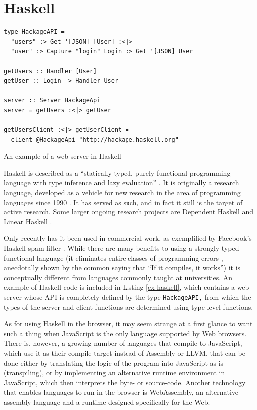 \documentclass[english,zadani,odsaz]{fitthesis}
\begin{document}
\section{Haskell}
\label{sec:orgc091c61}
\begin{listing}[!bp]
\begin{verbatim}
type HackageAPI =
  "users" :> Get '[JSON] [User] :<|>
  "user" :> Capture "login" Login :> Get '[JSON] User

getUsers :: Handler [User]
getUser :: Login -> Handler User

server :: Server HackageApi
server = getUsers :<|> getUser

getUsersClient :<|> getUserClient =
  client @HackageApi "http://hackage.haskell.org"
\end{verbatim}
\caption{An example of a web server in Haskell \label{ex-haskell}}
\end{listing}

Haskell is described as a ``statically typed, purely functional programming
language with type inference and lazy evaluation'' \cite{jones2003haskell}. It is
originally a research language, developed as a vehicle for new research in the
area of programming languages since 1990 \cite{haskell_history}. It has served as
such, and in fact it still is the target of active research. Some larger ongoing
research projects are Dependent Haskell \cite{eisenberg2016dependent} and Linear
Haskell \cite{bernardy2017linear}.

Only recently has it been used in commercial work, as exemplified by Facebook's
Haskell spam filter \cite{marlow2015fighting}. While there are many benefits to
using a strongly typed functional language (it eliminates entire classes of
programming errors \cite{Nanz_2015}, anecdotally shown by the common saying that
``If it compiles, it works'') it is conceptually different from languages commonly
taught at universities. An example of Haskell code is included in
Listing \ref{ex-haskell}, which contains a web server whose API is completely
defined by the type \texttt{HackageAPI,} from which the types of the server and client
functions are determined using type-level functions.

As for using Haskell in the browser, it may seem strange at a first glance to
want such a thing when JavaScript is the only language supported by Web
browsers. There is, however, a growing number of languages that compile to
JavaScript, which use it as their compile target instead of Assembly or LLVM,
that can be done either by translating the logic of the program into JavaScript
as is (transpiling), or by implementing an alternative runtime environment in
JavaScript, which then interprets the byte- or source-code. Another technology
that enables languages to run in the browser is WebAssembly, an alternative
assembly language and a runtime designed specifically for the Web.
\end{document}
